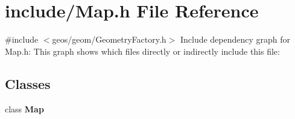 \section{include/\+Map.h File Reference}
\label{_map_8h}
{\ttfamily \#include $<$geos/geom/\+Geometry\+Factory.\+h$>$}\newline
Include dependency graph for Map.\+h\+:
This graph shows which files directly or indirectly include this file\+:
\subsection*{Classes}
\begin{DoxyCompactItemize}
\item 
class \textbf{ Map}
\end{DoxyCompactItemize}

